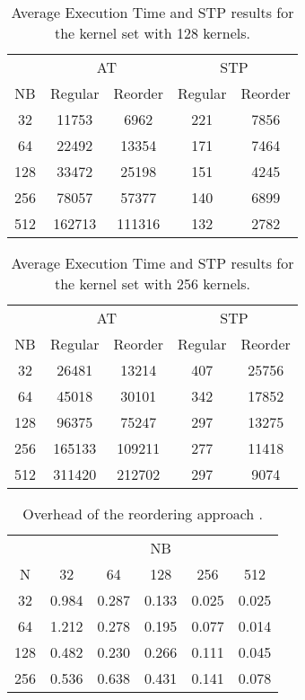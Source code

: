 \documentclass[conference]{IEEEtran}
\begin{document}
\begin{table}[htb]
    \centering
    \begin{tabular}{|c|c|c|c|c|} \hline
      & \multicolumn{2}{|c|}{AT} & \multicolumn{2}{|c|}{STP} \\ \cline{2-5}
 NB   & Regular & Reorder & Regular & Reorder \\ \hline
 32   & 11753   & 6962           & 221     & 7856           \\ \hline
 64   & 22492   & 13354          & 171     & 7464           \\ \hline
 128  & 33472   & 25198          & 151     & 4245           \\ \hline
 256  & 78057   & 57377          & 140     & 6899           \\ \hline
 512  & 162713  & 111316         & 132     & 2782           \\ \hline
    \end{tabular}
    \caption{Average Execution Time and STP results for the kernel set with 128 kernels.}
    \label{tab:128kernels-kepler}
\end{table}

\begin{table}[htb]
    \centering
    \begin{tabular}{|c|c|c|c|c|} \hline
      & \multicolumn{2}{|c|}{AT} & \multicolumn{2}{|c|}{STP} \\ \cline{2-5}
 NB   & Regular & Reorder & Regular & Reorder \\ \hline
 32   & 26481   & 13214          & 407     & 25756          \\ \hline
 64   & 45018   & 30101          & 342     & 17852          \\ \hline
 128  & 96375   & 75247          & 297     & 13275          \\ \hline
 256  & 165133  & 109211         & 277     & 11418          \\ \hline
 512  & 311420  & 212702         & 297     & 9074           \\ \hline
    \end{tabular}
    \caption{Average Execution Time and STP results for the kernel set with 256 kernels.}
    \label{tab:256kernels-kepler}
\end{table}

\begin{table}[htb]
    \centering
    \begin{tabular}{|c|c|c|c|c|c|} \hline
      & \multicolumn{5}{|c|}{NB}     \\ \cline{2-6}
 N    & 32  & 64  & 128  & 256 & 512 \\ \hline
 32   & 0.984 & 0.287 & 0.133 & 0.025 & 0.025 \\ \hline
 64   & 1.212 & 0.278 & 0.195 & 0.077 & 0.014 \\ \hline
 128  & 0.482 & 0.230 & 0.266 & 0.111 & 0.045 \\ \hline
 256  & 0.536 & 0.638 & 0.431 & 0.141 & 0.078 \\ \hline

    \end{tabular}
    \caption{Overhead of the reordering approach .}
    \label{tab:overhead-kepler}
\end{table}
\end{document}
